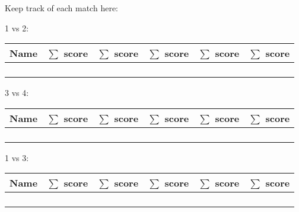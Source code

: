 \documentclass{article}
\begin{document}
Keep track of each match here:

\begin{center}
    1 vs 2: 
    \begin{tabular}{r|c|c|c|c|c}
        \toprule
        Name     & \(\sum\) score & \(\sum\) score & \(\sum\) score & \(\sum\) score & \(\sum\) score\\
        \midrule
                 &                &                &                &                & \\
                 &                &                &                &                & \\
        \midrule
                 &                &                &                &                & \\
                 &                &                &                &                & \\
        \bottomrule
    \end{tabular}
\end{center}

\begin{center}
    3 vs 4:
    \begin{tabular}{r|c|c|c|c|c}
        \toprule
        Name     & \(\sum\) score & \(\sum\) score & \(\sum\) score & \(\sum\) score & \(\sum\) score\\
        \midrule
                 &                &                &                &                & \\
                 &                &                &                &                & \\
        \midrule
                 &                &                &                &                & \\
                 &                &                &                &                & \\
        \bottomrule
    \end{tabular}
\end{center}

\begin{center}
    1 vs 3: 
    \begin{tabular}{r|c|c|c|c|c}
        \toprule
        Name     & \(\sum\) score & \(\sum\) score & \(\sum\) score & \(\sum\) score & \(\sum\) score\\
        \midrule
                 &                &                &                &                & \\
                 &                &                &                &                & \\
        \midrule
                 &                &                &                &                & \\
                 &                &                &                &                & \\
        \bottomrule
    \end{tabular}
\end{center}
\end{document}
